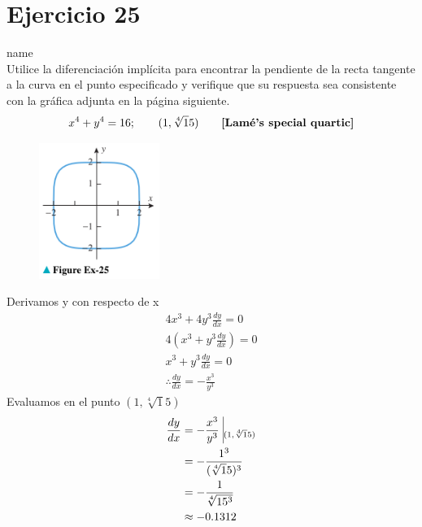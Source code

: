 \documentclass[12pt]{article}
\begin{document}
\section{Ejercicio 25} name \\

Utilice la diferenciación implícita para encontrar la pendiente de la recta tangente a la curva en el punto especificado y verifique que su respuesta sea consistente con la gráfica adjunta en la página siguiente.
\begin{equation*}
x^4+y^4=16; \qquad (1, \sqrt[4]15) \qquad \text{\textbf{[Lamé’s special quartic]}}
\end{equation*}
\begin{figure}[H]
\centering
\includegraphics[width=0.35\textwidth]{../img/img_Lista2/3_25.png}
\end{figure}
Derivamos y con respecto de x
\begin{align*}
  4x^3+4y^3\frac{dy}{dx}=0\\
  4(x^3+y^3\frac{dy}{dx})=0\\
  x^3+y^3\frac{dy}{dx}=0\\
  \therefore \frac{dy}{dx}=-\frac{x^3}{y^3}
\end{align*}
Evaluamos en el punto $(1, \sqrt[4]15)$
\begin{equation*}
  \begin{split}
    \frac{dy}{dx}
    &=-\frac{x^3}{y^3} ~ \vline_{(1, \sqrt[4]15)}\\
    &= -\frac{1^3}{(\sqrt[4]15)^3}\\
    &= -\frac{1}{\sqrt[4]{15^3}}\\
    &\approx -0.1312\\
  \end{split}
\end{equation*}

\end{document}
